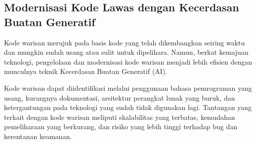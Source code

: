 \documentclass{article}
\begin{document}
\subsection{Modernisasi Kode Lawas dengan Kecerdasan Buatan Generatif}
Kode warisan merujuk pada basis kode yang telah dikembangkan seiring waktu dan mungkin sudah usang atau sulit untuk dipelihara. Namun, berkat kemajuan teknologi, pengelolaan dan modernisasi kode warisan menjadi lebih efisien dengan munculnya teknik Kecerdasan Buatan Generatif (AI).

Kode warisan dapat diidentifikasi melalui penggunaan bahasa pemrograman yang usang, kurangnya dokumentasi, arsitektur perangkat lunak yang buruk, dan ketergantungan pada teknologi yang sudah tidak digunakan lagi. Tantangan yang terkait dengan kode warisan meliputi skalabilitas yang terbatas, kemudahan pemeliharaan yang berkurang, dan risiko yang lebih tinggi terhadap bug dan kerentanan keamanan.
\end{document}
